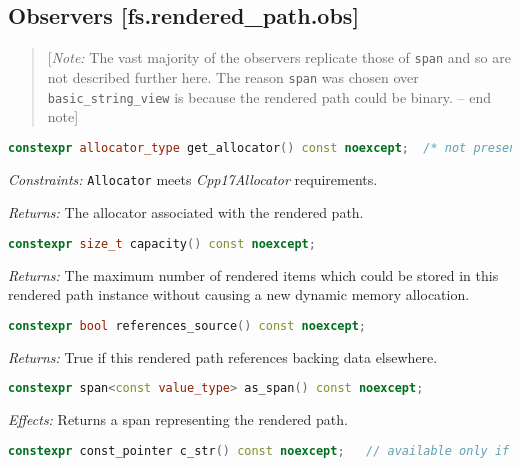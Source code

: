 \documentclass[11pt]{article}
\newcommand{\code}[2][cpp]{\lstinline[language=#1,basicstyle=\small\ttfamily]{#2}}
\newcommand{\desc}[1]{\textit{#1}}
\newcommand{\constraints}{\desc{Constraints: }}
\newcommand{\effects}{\desc{Effects: }}
\newcommand{\returns}{\desc{Returns: }}
\newcommand{\note}[1]{\begin{quote}[\textit{Note:} #1 -- end note]\end{quote}}
\begin{document}
\subsection*{Observers [fs.rendered\_path.obs]}

\color{black}

\note{The vast majority of the observers replicate those of \code{span} and so are not described further here. The reason \code{span} was chosen over \code{basic_string_view} is because the rendered path could be binary.}

\color{darkgreen}

\begin{lstlisting}[language=cpp]
    constexpr allocator_type get_allocator() const noexcept;  /* not present if default_rendered_path_allocator tag type was used */
\end{lstlisting}

\constraints \code{Allocator} meets \emph{Cpp17Allocator} requirements.

\returns The allocator associated with the rendered path.\\


\begin{lstlisting}[language=cpp]
    constexpr size_t capacity() const noexcept;
\end{lstlisting}

\returns The maximum number of rendered items which could be stored in this rendered path instance without causing a new dynamic memory allocation.\\


\begin{lstlisting}[language=cpp]
    constexpr bool references_source() const noexcept;
\end{lstlisting}

\returns True if this rendered path references backing data elsewhere.\\


\begin{lstlisting}[language=cpp]
    constexpr span<const value_type> as_span() const noexcept;
\end{lstlisting}

\effects Returns a span representing the rendered path.\\


\begin{lstlisting}[language=cpp]
    constexpr const_pointer c_str() const noexcept;   // available only if zero_terminated and non-byte backing
\end{lstlisting}
\end{document}
